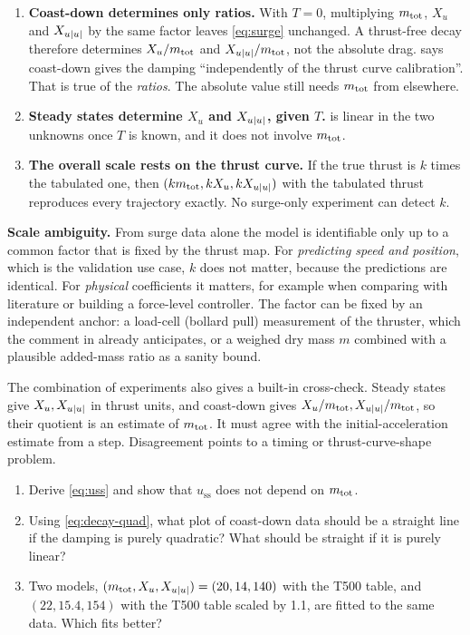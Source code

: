 \begin{enumerate}
  \item \textbf{Coast-down determines only ratios.} With $T=0$, multiplying $m_\mathrm{tot}$, $X_u$ and
        $X_{u|u|}$ by the same factor leaves \eqref{eq:surge} unchanged. A thrust-free decay
        therefore determines $X_u/m_\mathrm{tot}$ and $X_{u|u|}/m_\mathrm{tot}$, not the absolute drag.
         says coast-down gives the damping ``independently of the thrust
        curve calibration''. That is true of the \emph{ratios}. The absolute value still needs
        $m_\mathrm{tot}$ from elsewhere.
  \item \textbf{Steady states determine $X_u$ and $X_{u|u|}$, given $T$.}  is linear in the
        two unknowns once $T$ is known, and it does not involve $m_\mathrm{tot}$.
  \item \textbf{The overall scale rests on the thrust curve.} If the true thrust is $k$ times the
        tabulated one, then $(km_\mathrm{tot}, kX_u, kX_{u|u|})$ with the tabulated thrust reproduces every
        trajectory exactly. No surge-only experiment can detect $k$.
\end{enumerate}

\begin{keyidea}
\textbf{Scale ambiguity.} From surge data alone the model is identifiable only up to a common
factor that is fixed by the thrust map. For \emph{predicting speed and position}, which is the
validation use case, $k$ does not matter, because the predictions are identical. For
\emph{physical} coefficients it matters, for example when comparing with literature or
building a force-level controller. The factor can be fixed by an independent anchor: a
load-cell (bollard pull) measurement of the thruster, which the  comment in
 already anticipates, or a weighed dry mass $m$ combined with a plausible
added-mass ratio as a sanity bound.
\end{keyidea}

The combination of experiments also gives a built-in cross-check. Steady states give
$X_u, X_{u|u|}$ in thrust units, and coast-down gives $X_u/m_\mathrm{tot}, X_{u|u|}/m_\mathrm{tot}$, so their quotient
is an estimate of $m_\mathrm{tot}$. It must agree with the initial-acceleration estimate from a step.
Disagreement points to a timing or thrust-curve-shape problem.

\begin{questions}
\begin{enumerate}
  \item Derive \eqref{eq:uss} and show that $u_\mathrm{ss}$ does not depend on $m_\mathrm{tot}$.
  \item Using \eqref{eq:decay-quad}, what plot of coast-down data should be a straight line
        if the damping is purely quadratic? What should be straight if it is purely linear?
  \item Two models, $(m_\mathrm{tot}, X_u, X_{u|u|}) = (20, 14, 140)$ with the T500 table, and
        $(22, 15.4, 154)$ with the T500 table scaled by \num{1.1}, are fitted to the same data. Which
        fits better?
\end{enumerate}
\end{questions}
